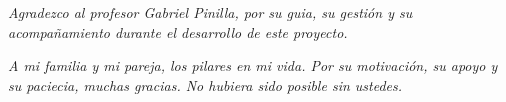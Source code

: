     \vspace{.2cm}
    \textit{Agradezco al profesor Gabriel Pinilla, por su guia, su  gestión y 
    su acompañamiento durante el desarrollo de este proyecto.} 
    
    \vspace{.2cm}
    \textit{A mi familia y mi pareja, los pilares en mi vida.  Por su motivación,
    su apoyo y su paciecia, muchas gracias. No hubiera sido posible sin ustedes.}

\clearpage
